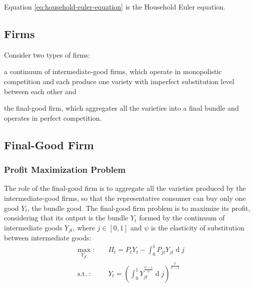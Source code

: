 \documentclass[
	12pt,
	]{article}
\numberwithin{equation}{section}
\DeclareMathOperator{\dif}{d}
\DeclareMathOperator{\st}{s.t.}
\theoremstyle{definition}
\theoremstyle{plain}
\theoremstyle{plain}
\theoremstyle{plain}
\begin{document}
Equation \ref{eq:household-euler-equation} is the Household Euler equation.


\subsection*{Firms}

Consider two types of firms: 
\begin{enumerate*}[label=(\arabic*)]
	\item a continuum of intermediate-good firms, which operate in monopolistic competition and each produce one variety with imperfect substitution level between each other and
	
	\item the final-good firm, which aggregates all the varieties into a final bundle and operates in perfect competition.
\end{enumerate*}


\subsection{Final-Good Firm}

\subsubsection*{Profit Maximization Problem}

The role of the final-good firm is to aggregate all the varieties produced by the intermediate-good firms, so that the representative consumer can buy only one good $Y_t$, the bundle good. The final-good firm problem is to maximize its profit, considering that its output is the bundle $Y_t$ formed by the continuum of intermediate goods $Y_{jt}$, where $j \in [0,1]$ and $\psi$ is the elasticity of substitution between intermediate goods:
\begin{align}
\label{eq:final-good-firm-max-problem}
	\max_{Y_{jt}}: &\quad \Pi_t = P_t Y_t - \int_{0}^{1} P_{jt} Y_{jt} \dif j\\
\label{eq:final-good-firm-bundle-rule}
	\st: & \quad Y_t = \left( \int_{0}^{1} Y_{jt}^{\frac{\psi-1}{\psi}} \dif j \right)^{\frac{\psi}{\psi-1}}
\end{align}
\end{document}
